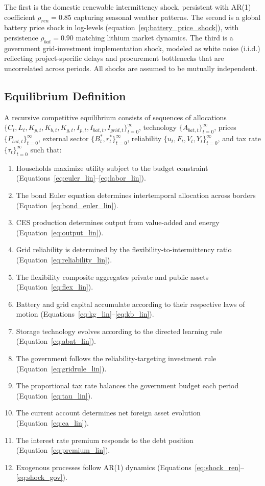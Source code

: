 \documentclass[12pt, a4paper]{article}
\begin{document}
	The first is the domestic renewable intermittency shock, persistent with AR(1) coefficient $\rho_{ren} = 0.85$ capturing seasonal weather patterns. The second is a global battery price shock in log-levels (equation~\ref{eq:battery_price_shock}), with persistence $\rho_{bat} = 0.90$ matching lithium market dynamics. The third is a government grid-investment implementation shock, modeled as white noise (i.i.d.) reflecting project-specific delays and procurement bottlenecks that are uncorrelated across periods. All shocks are assumed to be mutually independent.
	
	\subsection{Equilibrium Definition}
	
	A recursive competitive equilibrium consists of sequences of allocations $\{C_t, L_t, K_{p,t}, K_{b,t}, K_{g,t}, I_{p,t}, I_{bat,t}, I_{grid,t}\}_{t=0}^{\infty}$, technology $\{A_{bat,t}\}_{t=0}^{\infty}$, prices $\{P_{bat,t}\}_{t=0}^{\infty}$, external sector $\{B^*_t, r^*_t\}_{t=0}^{\infty}$, reliability $\{u_t, F_t, V_t, Y_t\}_{t=0}^{\infty}$, and tax rate $\{\tau_t\}_{t=0}^{\infty}$ such that:
	\begin{enumerate}
		\item Households maximize utility subject to the budget constraint (Equations~\ref{eq:euler_lin}--\ref{eq:labor_lin}).
		\item The bond Euler equation determines intertemporal allocation across borders (Equation~\ref{eq:bond_euler_lin}).
		\item CES production determines output from value-added and energy (Equation~\ref{eq:output_lin}).
		\item Grid reliability is determined by the flexibility-to-intermittency ratio (Equation~\ref{eq:reliability_lin}).
		\item The flexibility composite aggregates private and public assets (Equation~\ref{eq:flex_lin}).
		\item Battery and grid capital accumulate according to their respective laws of motion (Equations~\ref{eq:kg_lin}--\ref{eq:kb_lin}).
		\item Storage technology evolves according to the directed learning rule (Equation~\ref{eq:abat_lin}).
		\item The government follows the reliability-targeting investment rule (Equation~\ref{eq:gridrule_lin}).
		\item The proportional tax rate balances the government budget each period (Equation~\ref{eq:tau_lin}).
		\item The current account determines net foreign asset evolution (Equation~\ref{eq:ca_lin}).
		\item The interest rate premium responds to the debt position (Equation~\ref{eq:premium_lin}).
		\item Exogenous processes follow AR(1) dynamics (Equations~\ref{eq:shock_ren}--\ref{eq:shock_gov}).
	\end{enumerate}
	
\end{document}
